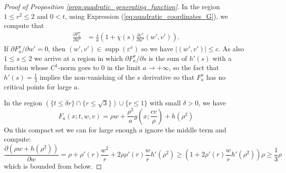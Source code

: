 \documentclass[reqno]{amsart}
\newcommand{\THOMAS}[1]%
	{\begin{quotation}{\footnotesize\textcolor{brown}{\textbf{Thomas:} #1}}\end{quotation}}
\renewcommand{\epsilon}{\varepsilon}
\theoremstyle{theorem}
\theoremstyle{remark}
\theoremstyle{definition}
\DeclareMathOperator{\supp}{supp}
\newcommand{\del}{\partial}
\begin{document}
\begin{proof}[Proof of Proposition \ref{prop:quadratic_generating_function}]
In the region $1 \leq r^2 \leq 2$ and $ 0 < t$, using Expression (\ref{eq:quadratic_coordinates_G}), we compute that %
\begin{align}
  \frac{\del F^x_a}{\del w'} & =\frac{s}{a}\left(1+ \chi(s)\frac{\del\epsilon^x}{\del w'}(w',v')\right).
\end{align}
If $\del F^x_a /\del w'=0$, then $(w',v') \in \supp(\epsilon^x)$ so we have $|(w',v')|\leq c$. As also $1 \leq s \leq 2$ we arrive at a region in which $ \partial F^x_a / \partial s$ is the sum of $h'(s)$ with a function whose $C^1$-norm goes to $0$ in the limit $a \to +\infty$, so the fact that  %
$h'(s)=\frac{1}{3}$ implies the non-vanishing of the $s$ derivative %
so that $F^x_a$ has no critical points for large $a$.




In the region $(\{t\leq \delta r\} \cap \{r \leq \sqrt 3\}) \cup \{r\leq 1\}$ with small $\delta >0$, we have
\[F_a(x;t,w,v)=\rho w+\frac{\rho^2}{a} g\left(x;\frac{cv}{\rho}\right)+ h(\rho^2)\]
On this compact set we can for large enough $a$ ignore the middle term and compute:
\[\frac{\del (\rho w + h(\rho^2))}{\del w}=\rho+\rho'(r)\frac{w^2}{r}+2\rho\rho'(r)\frac{w}{r}h'(\rho^2)  \geq (1+2\rho'(r)\frac{w}{r}h'(\rho^2))\rho \geq \frac13 \rho\]
which is bounded from below.



\end{proof}
\end{document}
